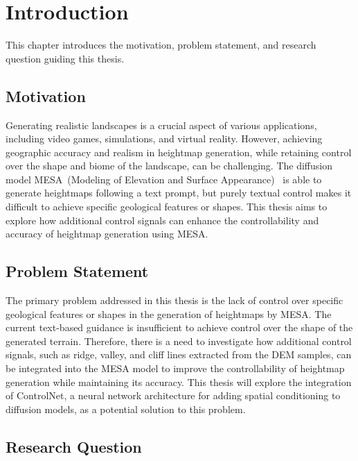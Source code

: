 \chapter{Introduction}
\label{cha:introduction}

This chapter introduces the motivation, problem statement, and research question guiding this thesis.

\section{Motivation}
\label{sec:motivation}

Generating realistic landscapes is a crucial aspect of various applications, including video games, simulations, and virtual reality. However, achieving geographic accuracy and realism in heightmap generation, while retaining control over the shape and biome of the landscape, can be challenging. The diffusion model MESA~(Modeling of Elevation and Surface Appearance)~\cite{borne-pons2025mesa} is able to generate heightmaps following a text prompt, but purely textual control makes it difficult to achieve specific geological features or shapes. This thesis aims to explore how additional control signals can enhance the controllability and accuracy of heightmap generation using MESA.

\section{Problem Statement}
\label{sec:problemstatement}

The primary problem addressed in this thesis is the lack of control over specific geological features or shapes in the generation of heightmaps by MESA. The current text-based guidance is insufficient to achieve control over the shape of the generated terrain. Therefore, there is a need to investigate how additional control signals, such as ridge, valley, and cliff lines extracted from the DEM samples, can be integrated into the MESA model to improve the controllability of heightmap generation while maintaining its accuracy. This thesis will explore the integration of ControlNet, a neural network architecture for adding spatial conditioning to diffusion models, as a potential solution to this problem.

\section{Research Question}
\label{sec:researchquestion}

